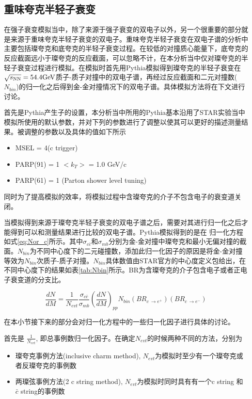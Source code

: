 \subsection{重味夸克半轻子衰变}

在强子衰变模拟当中，除了来源于强子衰变的双电子以外，另一个很重要的部分就是来源于重味夸克半轻子衰变的双电子。重味夸克半轻子衰变在双电子谱的分析中主要包括璨夸克和底夸克的半轻子衰变过程。在较低的对撞质心能量下，底夸克的反应截面远小于璨夸克的反应截面，可以忽略不计，在本分析当中仅对璨夸克的半轻子衰变过程进行模拟。在模拟时首先用Pythia模拟得到璨夸克的半轻子衰变在$\sqrt{s_{\mathrm{NN}}} = 54.4 \rm{GeV}$质子-质子对撞中的双电子谱，再经过反应截面和二元对撞数($N_{bin}$)的归一化之后得到金-金对撞情况下的双电子谱。具体模拟方法将在下文进行讨论。

首先是Pythia产生子的设置，本分析当中所用的Pythia基本沿用了STAR实验当中模拟所使用的默认参数，并对下列的参数进行了调整以使其可以更好的描述测量结果\cite{PhysRevD.86.072013}。被调整的参数以及具体的值如下所示
\begin{itemize}
    \item MSEL = 4(c trigger) 
    \item PARP(91) = 1 $<k_T>$ = 1.0 GeV/c
    \item PARP(61) = 1 (Parton shower level tuning)
\end{itemize}
同时为了提高模拟的效率，将模拟过程中含璨夸克的介子不包含电子的衰变道关闭。

当模拟得到来源于璨夸克半轻子衰变的双电子谱之后，需要对其进行归一化之后才能得到可以和测量结果进行比较的双电子谱。Pythia模拟得到的是在
归一化方程如式\ref{eq:Nor_c}所示。其中$\sigma_{c\bar{c}}$和$\sigma_{mb}$分别为金-金对撞中璨夸克和最小无偏对撞的截面。$N_{bin}$为不同中心度下的二元碰撞数，添加此归一化因子的原因是将金-金对撞等效为$N_{bin}$次质子-质子对撞。$N_{bin}$具体数值由STAR官方的中心度定义包给出，在不同中心度下的结果如表\ref{tab:Nbin}所示。BR为含璨夸克的介子包含电子或者正电子衰变道的分支比。

\begin{equation}
    \label{eq:Nor_c}
    \frac{dN}{dM} = \frac{1}{N_{evt}} \frac{\sigma_{c\bar{c}}}{\sigma_{mb}} (\frac{dN}{dM})_{pp} N_{bin} (BR_{c~\rightarrow e^+}) (BR_{c~\rightarrow e^-})
\end{equation}

在本小节接下来的部分会对归一化方程中的一些归一化因子进行具体的讨论。

首先是 $\frac{1}{N_{evt}}$, 即总事例数归一化因子。在确定$N_{evt}$的时候两种不同的方法，分别为
\begin{itemize}
    \item 璨夸克事例方法(inclusive charm method), $N_{evt}$为模拟时至少有一个璨夸克或者反璨夸克的事例数
    \item 两璨弦事例方法(2 c string method), $N_{evt}$为模拟时同时具有有一个c string 和 $\bar{c}$ string的事例数
\end{itemize}


